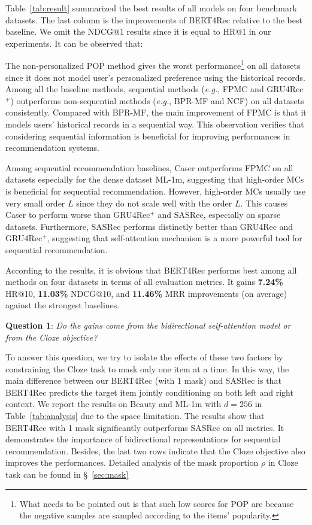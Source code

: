 Table~\ref{tab:result} summarized the best results of all models on four benchmark datasets.
The last column is the improvements of BERT4Rec relative to the best baseline.
We omit the NDCG@1 results since it is equal to HR@1 in our experiments.
It can be observed that:

The non-personalized POP method gives the worst performance\footnote{What needs to be pointed out is that such low scores for POP are because the negative samples are sampled according to the items' popularity.} on all datasets since it does not model user's personalized preference using the historical records.
Among all the baseline methods, sequential methods (\textit{e.g.}, FPMC and GRU4Rec$^+$) outperforms non-sequential methods (\textit{e.g.}, BPR-MF and NCF) on all datasets consistently.
Compared with BPR-MF, the main improvement of FPMC is that it models users' historical records in a sequential way.
This observation verifies that considering sequential information is beneficial for improving performances in recommendation systems.

Among sequential recommendation baselines, Caser outperforms FPMC on all datasets especially for the dense dataset ML-1m, suggesting that high-order MCs is beneficial for sequential recommendation.
However, high-order MCs usually use very small order $L$ since they do not scale well with the order $L$.
This causes Caser to perform worse than GRU4Rec$^+$ and SASRec, especially on sparse datasets.
Furthermore, SASRec performs distinctly better than GRU4Rec and GRU4Rec$^+$, suggesting that self-attention mechanism is a more powerful tool for sequential recommendation.


According to the results, it is obvious that BERT4Rec performs best  among all methods on four datasets in terms of all evaluation metrics.
It gains \textbf{7.24\%} HR@10, \textbf{11.03\%} NDCG@10, and \textbf{11.46\%} MRR improvements (on average) against the strongest baselines.

\noindent \textbf{Question 1}: \textit{Do the gains come from the bidirectional self-attention model or from the Cloze objective?}

To answer this question, we try to isolate the effects of these two factors by constraining the Cloze task to mask only one item at a time.
In this way, the main difference between our BERT4Rec (with 1 mask) and SASRec is that BERT4Rec predicts the target item jointly conditioning on both left and right context.
We report the results on Beauty and ML-1m with $d=256$ in Table~\ref{tab:analysis} due to the space limitation.
The results show that BERT4Rec with 1 mask significantly outperforms SASRec on all metrics.
It demonstrates the importance of bidirectional representations for sequential recommendation.
Besides, the last two rows indicate that the Cloze objective also improves the performances.
Detailed analysis of the mask proportion $\rho$ in Cloze task can be found in \S~\ref{sec:mask}

